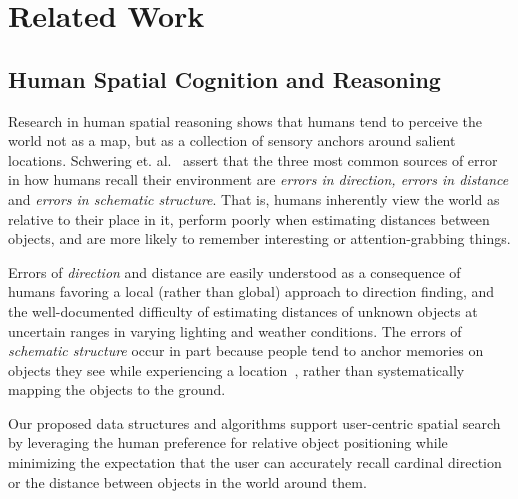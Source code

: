 \section{Related Work}
\label{section:related}


\subsection{Human Spatial Cognition and Reasoning}
\par{Research in human spatial reasoning shows that humans tend to perceive the world not as a map, but as a collection of sensory anchors around salient locations. 
Schwering et. al.~\cite{Schwering2014} assert that the three most common sources of error in how humans recall their environment are \textit{errors in direction, errors in distance} and \textit{errors in schematic structure}.
That is, humans inherently view the world as relative to their place in it, perform poorly when estimating distances between objects, and are more likely to remember interesting or attention-grabbing things.}
%
\par{Errors of \textit{direction} and distance are easily understood as a consequence of humans favoring a local (rather than global) approach to direction finding, and the well-documented difficulty of estimating distances of unknown objects at uncertain ranges in varying lighting and weather conditions. 
The errors of \textit{schematic structure} occur in part because people tend to anchor memories on objects they see while experiencing a location~\cite{Helbing2020}, rather than systematically mapping the objects to the ground.}
% 
\par{Our proposed data structures and algorithms support user-centric spatial search by leveraging the human preference for relative object positioning while minimizing the expectation that the user can accurately recall cardinal direction or the distance between objects in the world around them.}

